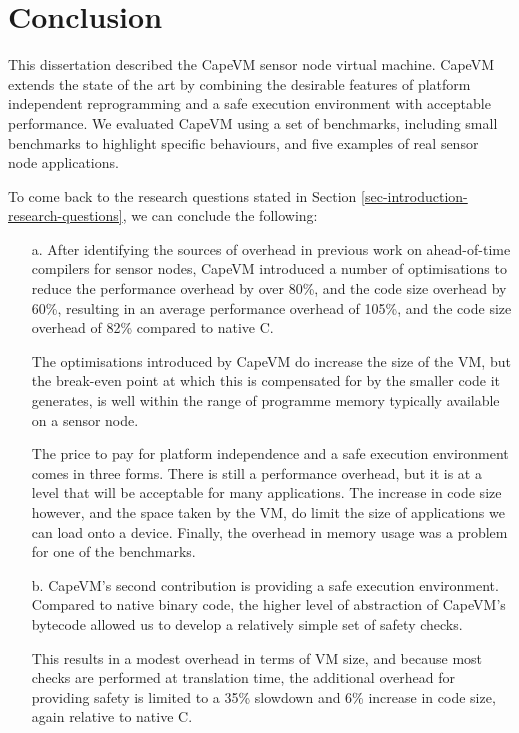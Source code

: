 \chapter{Conclusion}
This dissertation described the CapeVM sensor node virtual machine. CapeVM extends the state of the art by combining the desirable features of platform independent reprogramming and a safe execution environment with acceptable performance. We evaluated CapeVM using a set of benchmarks, including small benchmarks to highlight specific behaviours, and five examples of real sensor node applications.

To come back to the research questions stated in Section \ref{sec-introduction-research-questions}, we can conclude the following:

\begin{enumerate}
	\item[a.]
	After identifying the sources of overhead in previous work on ahead-of-time compilers for sensor nodes, CapeVM introduced a number of optimisations to reduce the performance overhead by over 80\%, and the code size overhead by 60\%, resulting in an average performance overhead of 105\%, and the code size overhead of 82\% compared to native C.

	The optimisations introduced by CapeVM do increase the size of the VM, but the break-even point at which this is compensated for by the smaller code it generates, is well within the range of programme memory typically available on a sensor node.

	The price to pay for platform independence and a safe execution environment comes in three forms. There is still a performance overhead, but it is at a level that will be acceptable for many applications. The increase in code size however, and the space taken by the VM, do limit the size of applications we can load onto a device. Finally, the overhead in memory usage was a problem for one of the benchmarks.

	\item[b.]
	CapeVM's second contribution is providing a safe execution environment. Compared to native binary code, the higher level of abstraction of CapeVM's bytecode allowed us to develop a relatively simple set of safety checks.
	
	This results in a modest overhead in terms of VM size, and because most checks are performed at translation time, the additional overhead for providing safety is limited to a 35\% slowdown and 6\% increase in code size, again relative to native C.
	

\end{enumerate}
